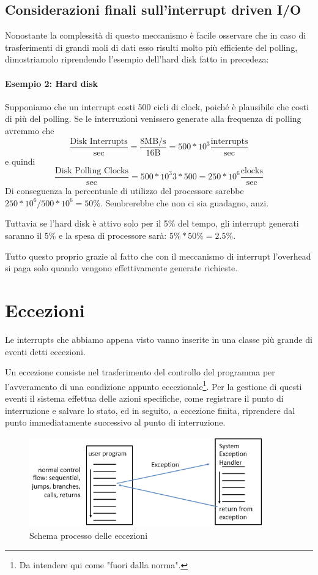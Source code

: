 \documentclass[class=book, crop=false, oneside]{standalone}
\begin{document}
\subsection{Considerazioni finali sull'interrupt driven I/O}
Nonostante la complessità di questo meccanismo è facile osservare che in caso di trasferimenti di grandi moli di dati esso risulti  molto più efficiente del polling, dimostriamolo riprendendo l'esempio dell'hard disk fatto in precedeza:

\paragraph{Esempio 2: Hard disk} Supponiamo che un interrupt costi 500 cicli di clock, poiché è plausibile che costi di più del polling.
Se le interruzioni venissero generate alla frequenza di polling avremmo che \[\frac{\textrm{Disk Interrupts}}{\textrm{sec}}=\frac{8 \textrm{MB/s}}{16\textrm{B}}=500*10^{3}\frac{\textrm{interrupts}}{\textrm{sec}}\] e quindi \[\frac{\textrm{Disk Polling Clocks}}{\textrm{sec}}=500*10^3{3}*500=250*10^{6} \frac{\textrm{clocks}}{\textrm{sec}}\] Di conseguenza la percentuale di utilizzo del processore sarebbe \(250*10^{6}/500*10^{6}= 50\%\). Sembrerebbe che non ci sia guadagno, anzi.

Tuttavia se l’hard disk è attivo solo per il 5\% del tempo, gli interrupt generati saranno il 5\% e la spesa di processore sarà: \(5\% * 50\%=2.5\%\).

Tutto questo proprio grazie al fatto che con il meccanismo di interrupt l’overhead si paga solo quando vengono effettivamente generate richieste.

\section{Eccezioni}
Le interrupts che abbiamo appena visto vanno inserite in una classe più grande di eventi detti eccezioni.

Un eccezione consiste nel trasferimento del controllo del programma per l'avveramento di una condizione appunto eccezionale\footnote{Da intendere qui come "fuori dalla norma".}.
Per la gestione di questi eventi il sistema effettua delle azioni specifiche, come registrare il punto di interruzione e salvare lo stato, ed in seguito, a eccezione finita, riprendere dal punto immediatamente successivo al punto di interruzione.

\begin{figure}[!h]
	\centering
	\includegraphics[width=0.9\textwidth,keepaspectratio]{schema-eccezioni}
	\caption{Schema processo delle eccezioni}
\end{figure}
\end{document}
